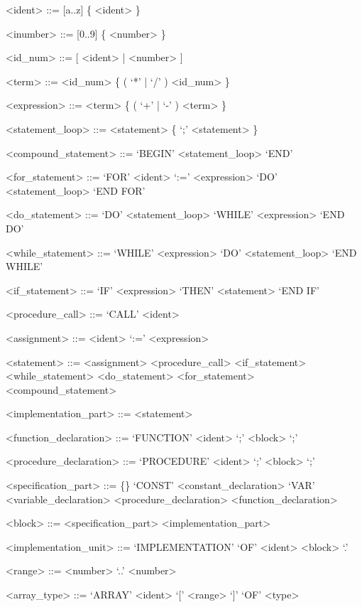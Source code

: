 \documentclass[]{article}
\begin{document}
\setlength{\grammarparsep}{20pt plus 1pt minus 1pt} %
\setlength{\grammarindent}{12em} %

\begin{grammar}
	
	<ident> ::= [a..z] \{ <ident> \}
	
	<inumber> ::= [0..9] \{ <number> \}
	
	<id_num> ::= [ <ident> | <number> ]
	
	<term> ::= <id_num> \{ ( `*'  | `/' ) <id_num> \}
	
	<expression> ::= <term> \{ ( `+' | `-' ) <term> \}
	
	<statement_loop> ::= <statement> \{  `;' <statement> \}
	
	<compound_statement> ::= `BEGIN' <statement_loop> `END'
	
	<for_statement> ::= `FOR' <ident> `:=' <expression> `DO' <statement_loop> `END FOR'
	
	<do_statement> ::= `DO' <statement_loop> `WHILE' <expression> `END DO'
	
	<while_statement> ::= `WHILE' <expression> `DO' <statement_loop> `END WHILE'
	
	<if_statement> ::= `IF' <expression> `THEN' <statement> `END IF'
	
	<procedure_call> ::= `CALL' <ident>
	
	<assignment> ::= <ident> `:=' <expression>
	
	<statement> ::= <assignment>
	\alt <procedure_call>
	\alt <if_statement>
	\alt <while_statement>
	\alt <do_statement>
	\alt <for_statement>
	\alt <compound_statement>
	
	<implementation_part> ::= <statement>
	
	<function_declaration> ::= `FUNCTION' <ident> `;' <block> `;'
	
	<procedure_declaration> ::= `PROCEDURE' <ident> `;' <block> `;'
	
	<specification_part> ::= \{\}
    \alt `CONST' <constant_declaration>
	\alt `VAR' <variable_declaration>
	\alt <procedure_declaration>
	\alt <function_declaration>

	<block> ::= <specification_part> <implementation_part>
	
	<implementation_unit> ::= `IMPLEMENTATION' `OF' <ident> <block> `.'
	
	<range> ::= <number> `..' <number>
	
	<array_type> ::= `ARRAY' <ident> `[' <range> `]' `OF' <type>
	

\end{grammar}
\end{document}
